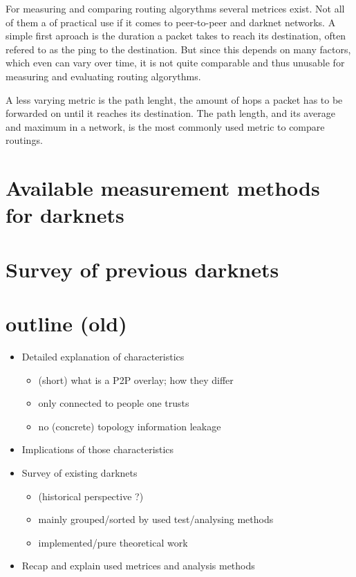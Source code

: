 For measuring and comparing routing algorythms several metrices exist. Not all of them a of practical use if it comes to peer-to-peer and darknet networks. A simple first aproach  is the duration a packet takes to reach its destination, often refered to as the ping to the destination. But since this depends on many factors, which even can vary over time, it is not quite comparable and thus unusable for measuring and evaluating routing algorythms.

A less varying metric is the path lenght, the amount of hops a packet has to be forwarded on until it reaches its destination. The path length, and its average and maximum in a network, is the most commonly used metric to compare routings.



\section{Available measurement methods for darknets}

\section{Survey of previous darknets}

\section{outline (old)}
\begin{itemize}
\item    Detailed explanation of characteristics
\begin{itemize}
\item        (short) what is a P2P overlay; how they differ
\item        only connected to people one trusts
\item        no (concrete) topology information leakage
\end{itemize}
\item    Implications of those characteristics
\item    Survey of existing darknets
\begin{itemize}
\item        (historical perspective ?)
\item        mainly grouped/sorted by used test/analysing methods
\item        implemented/pure theoretical work
\end{itemize}
\item    Recap and explain used metrices and analysis methods
\end{itemize}
